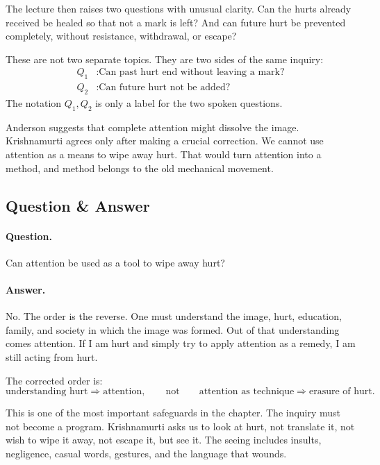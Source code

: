 The lecture then raises two questions with unusual clarity. Can the hurts already received be healed so that not a mark is left? And can future hurt be prevented completely, without resistance, withdrawal, or escape?

These are not two separate topics. They are two sides of the same inquiry:
\begin{align}
Q_1 &: \text{Can past hurt end without leaving a mark?}\\
Q_2 &: \text{Can future hurt not be added?}
\end{align}
The notation \(Q_1,Q_2\) is only a label for the two spoken questions.

Anderson suggests that complete attention might dissolve the image. Krishnamurti agrees only after making a crucial correction. We cannot use attention as a means to wipe away hurt. That would turn attention into a method, and method belongs to the old mechanical movement.

\subsection{Question \& Answer}

\paragraph{Question.}
Can attention be used as a tool to wipe away hurt?

\paragraph{Answer.}
No. The order is the reverse. One must understand the image, hurt, education, family, and society in which the image was formed. Out of that understanding comes attention. If I am hurt and simply try to apply attention as a remedy, I am still acting from hurt.

The corrected order is:
\begin{equation}
\text{understanding hurt}
\Rightarrow
\text{attention},
\qquad
\text{not}
\qquad
\text{attention as technique}
\Rightarrow
\text{erasure of hurt}.
\end{equation}

This is one of the most important safeguards in the chapter. The inquiry must not become a program. Krishnamurti asks us to look at hurt, not translate it, not wish to wipe it away, not escape it, but see it. The seeing includes insults, negligence, casual words, gestures, and the language that wounds.

